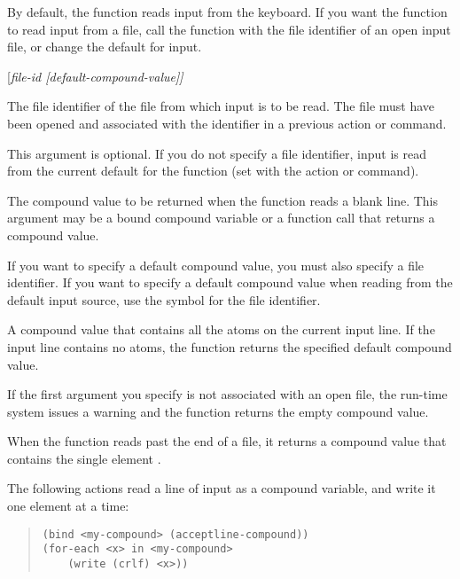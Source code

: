 By default, the  function reads input from the
keyboard. If you want the function to read input from a file, call the
function with the file identifier of an open input file, or change the
default for input.

\Format

 [\it{file-id} [\it{default-compound-value}]]

\begin{arguments}
\item[file-id]

  The file identifier of the file from which input is to be read. The
  file must have been opened and associated with the identifier in a
  previous  action or command.

  This argument is optional. If you do not specify a file identifier,
  input is read from the current default for the
   function (set with the  action
  or command).

\item[default-compound-value]

  The compound value to be returned when the function reads a blank
  line. This argument may be a bound compound variable or a function
  call that returns a compound value.

  If you want to specify a default compound value, you must also
  specify a file identifier. If you want to specify a default compound
  value when reading from the default input source, use the symbol
   for the file identifier.
\end{arguments}

\ReturnValue

A compound value that contains all the atoms on the current input
line. If the input line contains no atoms, the function returns the
specified default compound value.

If the first argument you specify is not associated with an open file,
the run-time system issues a warning and the function returns the
empty compound value.

When the function reads past the end of a file, it returns a compound
value that contains the single element .

\Example

The following actions read a line of input as a compound variable, and
write it one element at a time:

\begin{quote}
\begin{verbatim}
(bind <my-compound> (acceptline-compound))
(for-each <x> in <my-compound>
    (write (crlf) <x>))
\end{verbatim}
\end{quote}
  

